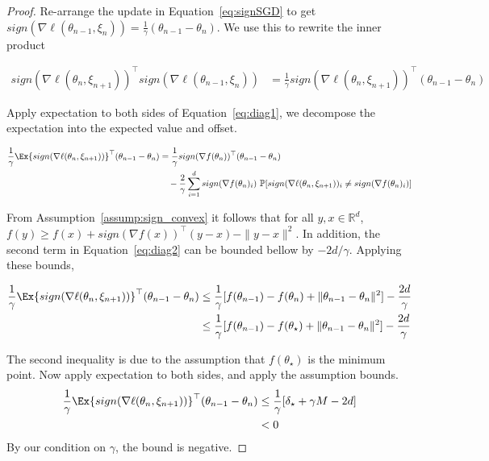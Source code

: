 \documentclass[12pt]{article}
\begin{document}
\begin{proof}
Re-arrange the update in Equation~\ref{eq:signSGD} to get $sign( \nabla \ell ( \theta_{n-1}, \xi_n ) ) = \frac{1}{\gamma} ( \theta_{n-1} - \theta_n )$.
We use this to rewrite the inner product

\begin{align}
\label{eq:diag1}
sign( \nabla \ell( \theta_n, \xi_{n+1} ) )^\top sign( \nabla \ell( \theta_{n-1}, \xi_n ) ) &= \frac{1}{\gamma} sign( \nabla \ell( \theta_n, \xi_{n+1} ) )^\top ( \theta_{n-1} - \theta_n )
\end{align}

Apply expectation to both sides of Equation~\ref{eq:diag1}, we decompose the expectation into the expected value and offset.

\begin{align}
\label{eq:diag2}
\frac{1}{\gamma} \Ex{ sign( \nabla \ell( \theta_n, \xi_{n+1} ) ) }^\top ( \theta_{n-1} - \theta_n ) 
&= \frac{1}{\gamma} sign ( \nabla f ( \theta_{n} ) )^\top ( \theta_{n-1} - \theta_n ) \\
&\quad - \frac{2}{\gamma} \sum_{i=1}^{d} sign( \nabla f ( \theta_{n} )_i ) \ \mathbb{P} [ sign( \nabla \ell( \theta_n, \xi_{n+1} ) )_i \neq sign( \nabla f ( \theta_{n} )_i ) ] \nonumber
\end{align}

From Assumption~\ref{assump:sign_convex} it follows that for all $y, x \in \mathbb{R}^d$, $f (y) \geq f (x) + sign( \nabla f (x) )^\top (y - x) - \| y - x \|^2$.
In addition, the second term in Equation~\ref{eq:diag2} can be bounded bellow by $- 2 d / \gamma$.
Applying these bounds,

\begin{align*}
\frac{1}{\gamma} \Ex{ sign( \nabla \ell( \theta_n, \xi_{n+1} ) ) }^\top ( \theta_{n-1} - \theta_n ) 
&\leq \frac{1}{\gamma} [ f( \theta_{n-1} ) - f( \theta_n ) + \| \theta_{n-1} - \theta_n \|^2 ] - \frac{2 d}{\gamma} \\
&\leq \frac{1}{\gamma} [ f( \theta_{n-1} ) - f( \theta_\star ) + \| \theta_{n-1} - \theta_n \|^2 ] - \frac{2 d}{\gamma}
\end{align*}

The second inequality is due to the assumption that $f (\theta_\star)$ is the minimum point.
Now apply expectation to both sides, and apply the assumption bounds.
\begin{align*}
\frac{1}{\gamma} \Ex{ sign( \nabla \ell( \theta_n, \xi_{n+1} ) ) }^\top ( \theta_{n-1} - \theta_n ) 
&\leq \frac{1}{\gamma} [ \delta_\star + \gamma M - 2d ] \\
&< 0
\end{align*}
By our condition on $\gamma$, the bound is negative.

\end{proof}
\end{document}
